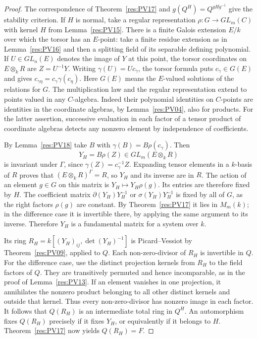 \documentclass[11pt,oneside,openany]{book}
\theoremstyle{definition}
\theoremstyle{remark}
\begin{document}
\begin{proof}
The correspondence of Theorem~\ref{res:PV17} and
\(g(Q^H)=Q^{gHg^{-1}}\) give the stability criterion.
If \(H\) is normal, take a regular representation
\(\rho:G\to GL_m(C)\) with kernel \(H\) from
Lemma~\ref{res:PV15}. There is a finite Galois extension \(E/k\)
over which the torsor has an \(E\)-point: take a finite residue
extension as in Lemma~\ref{res:PV16} and then a splitting
field of its separable defining polynomial. If \(U\in GL_n(E)\)
denotes the image of \(Y\) at this point, the torsor coordinates
on \(E\otimes_k R\) are \(Z=U^{-1}Y\). Writing
\(\gamma(U)=U c_\gamma\), the torsor formula puts
\(c_\gamma\in G(E)\) and gives
\(c_{\gamma\eta}=c_\gamma\gamma(c_\eta)\). Here \(G(E)\)
means the \(E\)-valued solutions of the relations for \(G\).
The multiplication law and the regular representation extend
to points valued in any \(C\)-algebra. Indeed their polynomial identities on
\(C\)-points are identities in the coordinate algebras,
by Lemma~\ref{res:PV04}, also for products. For the latter
assertion, successive evaluation in each factor of a
tensor product of coordinate algebras detects any nonzero
element by independence of coefficients.

By Lemma~\ref{res:PV18} take \(B\) with
\(\gamma(B)=B\rho(c_\gamma)\). Then
\[
 Y_H=B\rho(Z)\in GL_m(E\otimes_k R)
\]
is invariant under \(\Gamma\), since
\(\gamma(Z)=c_\gamma^{-1} Z\).
Expanding tensor elements in a \(k\)-basis of \(R\) proves
that \((E\otimes_k R)^\Gamma=R\), so \(Y_H\) and its inverse
are in \(R\). The action of an element \(g\in G\) on this
matrix is \(Y_H\mapsto Y_H\rho(g)\). Its entries are therefore
fixed by \(H\). The coefficient matrix
\(\partial(Y_H)Y_H^{-1}\) or \(\sigma(Y_H)Y_H^{-1}\) is
fixed by all of \(G\), as the right factors \(\rho(g)\)
are constant. By Theorem~\ref{res:PV17} it lies in \(M_m(k)\);
in the difference case it is invertible there, by applying
the same argument to its inverse. Therefore \(Y_H\) is a
fundamental matrix for a system over \(k\).

Its ring \(R_H=k[(Y_H)_{ij},\det(Y_H)^{-1}]\) is
Picard--Vessiot by Theorem~\ref{res:PV09}, applied to \(Q\).
Each non-zero-divisor of \(R_H\) is invertible in \(Q\).
For the difference case, use the distinct projection kernels
from \(R_H\) to the field factors of \(Q\). They are
transitively permuted and hence incomparable, as in the proof
of Lemma~\ref{res:PV13}. If an element vanishes in one
projection, it annihilates the nonzero product belonging to
all other distinct kernels and outside that kernel. Thus
every non-zero-divisor has nonzero image in each factor.
It follows that \(Q(R_H)\) is an intermediate total ring in
\(Q^H\). An automorphism fixes \(Q(R_H)\) precisely if it
fixes \(Y_H\), or equivalently if it belongs to \(H\).
Theorem~\ref{res:PV17} now yields \(Q(R_H)=F\).


\end{proof}
\end{document}

